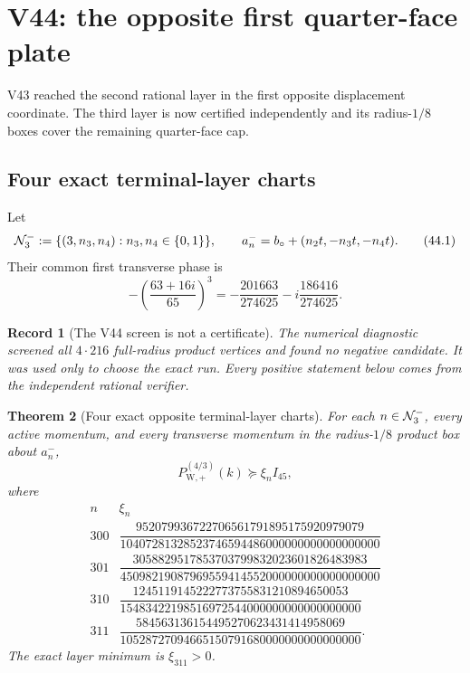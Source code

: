 \documentclass[11pt,oneside]{article}
\newtheorem{theorem}{Theorem}[section]
\newtheorem{record}[theorem]{Record}
\theoremstyle{definition}
\theoremstyle{remark}
\begin{document}
\section{V44: the opposite first quarter-face plate}
\label{sec:newv44-opposite-first-face}

V43 reached the second rational layer in the first opposite
displacement coordinate.  The third layer is now certified
independently and its radius-\(1/8\) boxes cover the remaining
quarter-face cap.

\subsection{Four exact terminal-layer charts}

Let
\[
 {\cal N}_{3}^{-}:=\{(3,n_3,n_4):n_3,n_4\in\{0,1\}\},
\qquad
 a_n^-=b_\circ+(n_2t,-n_3t,-n_4t).                   \tag{44.1}
\]
Their common first transverse phase is
\[
 -\left(\frac{63+16i}{65}\right)^3
 =-\frac{201663}{274625}-i\frac{186416}{274625}.       \tag{44.2}
\]

\begin{record}[The V44 screen is not a certificate]
\label{rec:newv44-screen}
The numerical diagnostic screened all \(4\cdot216\) full-radius
product vertices and found no negative candidate.  It was used only
to choose the exact run.  Every positive statement below comes from
the independent rational verifier.
\end{record}

\begin{theorem}[Four exact opposite terminal-layer charts]
\label{thm:newv44-four-charts}
For each \(n\in{\cal N}_3^-\), every active momentum, and every
transverse momentum in the radius-\(1/8\) product box about \(a_n^-\),
\[
 P_{\mathrm W,+}^{(4/3)}(k)\succeq\xi_n I_{45},        \tag{44.3}
\]
where
\[
\begin{array}{c|c}
n&\xi_n\\ \hline
300&\dfrac{952079936722706561791895175920979079}
{10407281328523746594486000000000000000000}\\[5pt]
301&\dfrac{3058829517853703799832023601826483983}
{45098219087969559414552000000000000000000}\\[5pt]
310&\dfrac{1245119145222773755831210894650053}
{15483422198516972544000000000000000000}\\[5pt]
311&\dfrac{584563136154495270623431414958069}
{10528727094665150791680000000000000000}.
\end{array}                                             \tag{44.4}
\]
The exact layer minimum is \(\xi_{311}>0\).
\end{theorem}
\end{document}
